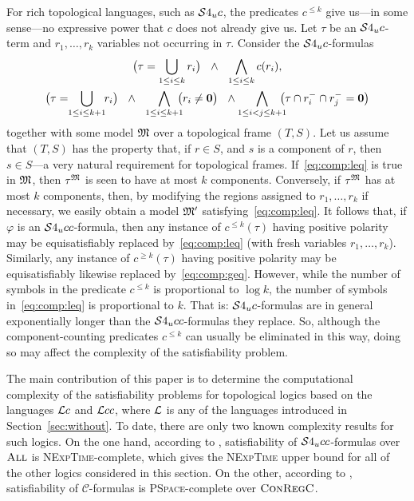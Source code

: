 \documentclass{LMCS}
\theoremstyle{plain}
\newcommand{\cBC}{\ensuremath{\mathcal{C}}}
\newcommand{\tc}[2][]{#2^{-_{#1}}}
\newcommand{\All}{\textsc{All}}
\newcommand{\ConR}{\textsc{ConRegC}}
\newcommand{\PSpace}{\textsc{PSpace}}
\newcommand{\NExpTime}{\textsc{NExpTime}}
\newcommand{\Res}{{S}}\newcommand{\RegC}{\textsc{RC}}
\begin{document}
For rich topological languages, such as $\mathcal{S}4_u{}c$, the predicates
$c^{\leq k}$ give us---in some sense---no expressive power that $c$
does not already give us.  Let $\tau$ be an $\mathcal{S}4_u{}c$-term and
$r_1,\dots,r_k$ variables not occurring in $\tau$. Consider the
$\mathcal{S}4_u{}c$-formulas
\begin{gather}\label{eq:comp:leq}
\bigl(\tau = \bigcup_{1 \leq i \leq k} r_i\bigr)  \ \  \wedge \ \
\bigwedge_{1 \leq i \leq k}c(r_i),\\
\label{eq:comp:geq} \bigl(\tau = \hspace*{-0.3em}\bigcup_{1 \leq i
\leq k+1} \hspace*{-0.3em} r_i\bigr) \ \  \wedge  \ \ \bigwedge_{1
\leq i \leq k+1} \hspace*{-0.5em} \bigl(r_i \ne \zero\bigr)
\ \  \wedge  \bigwedge_{1 \leq i < j \leq k+1}\hspace*{-0.6em} \bigl(\tau \cap \tc{r_i} \cap \tc{r_j} = \zero\bigr) \end{gather}
together with some model $\mathfrak{M}$ over a topological frame $(T,
\Res)$.  Let us assume that $(T, \Res)$ has the property that, if $r
\in \Res$, and $s$ is a component of $r$, then $s \in \Res$---a very
natural requirement for topological frames.  If~\eqref{eq:comp:leq} is
true in $\mathfrak{M}$, then $\tau^{\mathfrak{M}}$ is
seen to have at most $k$
components.  Conversely, if $\tau^{\mathfrak{M}}$ has at most $k$ components,
then, by modifying the regions assigned to $r_1, \ldots, r_k$ if
necessary, we easily obtain a model $\mathfrak{M}'$
satisfying~\eqref{eq:comp:leq}. It follows that, if $\varphi$ is an
$\mathcal{S}4_u{}cc$-formula, then any instance of $c^{\leq k}(\tau)$ having
positive polarity may be equisatisfiably replaced
by~\eqref{eq:comp:leq} (with fresh variables $r_1, \ldots, r_k$).
Similarly, any instance of $c^{\geq k}(\tau)$ having positive polarity
may be equisatisfiably likewise replaced by~\eqref{eq:comp:geq}.
However, while the number of symbols in the predicate $c^{\leq k}$ is
proportional to $\log k$, the number of symbols in~\eqref{eq:comp:leq}
is proportional to $k$. That is: $\mathcal{S}4_u{}c$-formulas are in general
exponentially longer than the $\mathcal{S}4_u{}cc$-formulas they replace.  So,
although the component-counting predicates $c^{\leq k}$ can usually be
eliminated in this way, doing so may affect the complexity of the
satisfiability problem.

The main contribution of this paper is to determine the computational
complexity of the satisfiability problems for topological logics based
on the languages $\mathcal{L}c$ and $\mathcal{L}cc$, where $\mathcal{L}$ is any of the
languages introduced in Section~\ref{sec:without}. To date, there are
only two known complexity results for such logics. On the one hand,
according to \cite{PrattHartmann02}, satisfiability of
$\mathcal{S}4_u{}cc$-formulas over $\All$ is \NExpTime-complete, which gives the
\NExpTime{} upper bound for all of the other logics considered in this
section.  On the other, according to \cite{Wolter&Z00ecai},
satisfiability of $\cBC$-formulas is
\PSpace-complete over $\ConR$.
\end{document}
